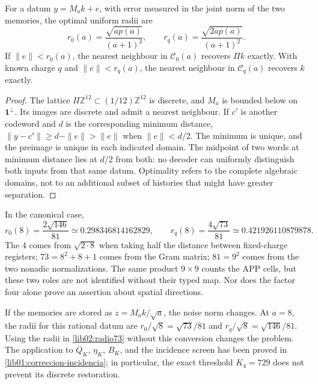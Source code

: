 \begin{theorem}
\label{lib02:radios-memoria}
For a datum \(y=M_ak+e\), with error measured in the joint norm of the two memories, the optimal uniform radii are
\begin{equation}
 r_0(a)=\frac{\sqrt{ap(a)}}{(a+1)^2},\qquad
 r_q(a)=\frac{\sqrt{2ap(a)}}{(a+1)^2}.
 \label{lib02:radios}
\end{equation}
If \(\|e\|<r_0(a)\), the nearest neighbour in \(\mathcal C_0(a)\) recovers \(\Pi k\) exactly. With known charge \(q\) and \(\|e\|<r_q(a)\), the nearest neighbour in \(\mathcal C_q(a)\) recovers \(k\) exactly.
\end{theorem}
\begin{proof}
The lattice \(\Pi\mathbb Z^{12}\subset(1/12)\mathbb Z^{12}\) is discrete, and \(M_a\) is bounded below on \(\mathbf1^\perp\). Its images are discrete and admit a nearest neighbour. If \(c'\) is another codeword and \(d\) is the corresponding minimum distance, \(\|y-c'\|\geq d-\|e\|>\|e\|\) when \(\|e\|<d/2\). The minimum is unique, and the preimage is unique in each indicated domain. The midpoint of two words at minimum distance lies at \(d/2\) from both: no decoder can uniformly distinguish both inputs from that same datum. Optimality refers to the complete algebraic domains, not to an additional subset of histories that might have greater separation.
\end{proof}

In the canonical case,
\begin{equation}
 r_0(8)=\frac{2\sqrt{146}}{81}\simeq0.298346814162829,
 \qquad
 r_q(8)=\frac{4\sqrt{73}}{81}\simeq0.421926110879878.
 \label{lib02:radio73}
\end{equation}
The \(4\) comes from \(\sqrt{2\cdot8}\) when taking half the distance between fixed-charge registers; \(73=8^2+8+1\) comes from the Gram matrix; \(81=9^2\) comes from the two nonadic normalizations. The same product \(9\times9\) counts the APP cells, but these two roles are not identified without their typed map. Nor does the factor four alone prove an assertion about spatial directions.

If the memories are stored as \(z=M_ak/\sqrt a\), the noise norm changes. At \(a=8\), the radii for this rational datum are \(r_0/\sqrt8=\sqrt{73}/81\) and \(r_q/\sqrt8=\sqrt{146}/81\). Using the radii in \eqref{lib02:radio73} without this conversion changes the problem. The application to \(Q_K\), \(\eta_K\), \(B_K\), and the incidence screen has been proved in \cref{lib01:correccion-incidencia}; in particular, the exact threshold \(K_4=729\) does not prevent its discrete restoration.


